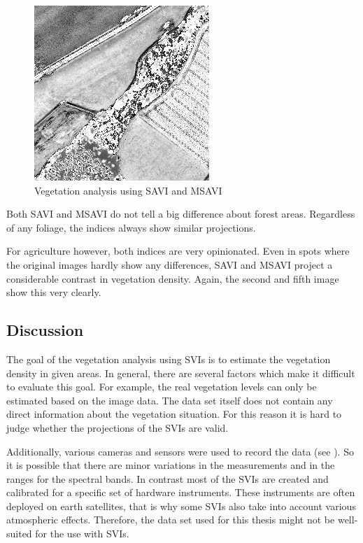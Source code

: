 \begin{figure}
    \includegraphics[width=\VegetationIndicesImageWidth]{images/vegetation/msavi/5}

    \caption{Vegetation analysis using SAVI and MSAVI}
    \label{fig:vegetation_savi_examples}
\end{figure}

Both SAVI and MSAVI do not tell a big difference about forest areas. Regardless of any foliage, the indices always show similar projections.

For agriculture however, both indices are very opinionated. Even in spots where the original images hardly show any differences, SAVI and MSAVI project a considerable contrast in vegetation density. Again, the second and fifth image show this very clearly.

\subsection{Discussion}
The goal of the vegetation analysis using SVIs is to estimate the vegetation density in given areas. In general, there are several factors which make it difficult to evaluate this goal. For example, the real vegetation levels can only be estimated based on the image data. The data set itself does not contain any direct information about the vegetation situation. For this reason it is hard to judge whether the projections of the SVIs are valid.

Additionally, various cameras and sensors were used to record the data (see ). So it is possible that there are minor variations in the measurements and in the ranges for the spectral bands. In contrast most of the SVIs are created and calibrated for a specific set of hardware instruments. These instruments are often deployed on earth satellites, that is why some SVIs also take into account various atmospheric effects. Therefore, the data set used for this thesis might not be well-suited for the use with SVIs.

